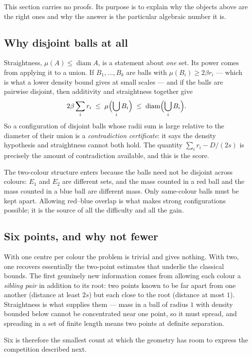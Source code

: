 \documentclass[11pt]{article}
\theoremstyle{plain}
\theoremstyle{definition}
\theoremstyle{remark}
\newcommand{\diam}{\operatorname{diam}}
\begin{document}
This section carries no proofs.  Its purpose is to explain why the objects
above are the right ones and why the answer is the particular algebraic
number it is.

\subsection{Why disjoint balls at all}

Straightness, $\mu(A)\le\diam A$, is a statement about \emph{one} set.  Its
power comes from applying it to a union.  If $B_1,\dots,B_k$ are balls with
$\mu(B_i)\ge 2\beta r_i$ --- which is what a lower density bound gives at
small scales --- and if the balls are pairwise disjoint, then additivity
and straightness together give
\[
 2\beta\sum_i r_i\;\le\;\mu\Bigl(\bigcup_i B_i\Bigr)\;\le\;\diam\Bigl(\bigcup_i
 B_i\Bigr).
\]
So a configuration of disjoint balls whose radii sum is large relative to
the diameter of their union is a \emph{contradiction certificate}: it says
the density hypothesis and straightness cannot both hold.  The quantity
$\sum_i r_i-D/(2s)$ is precisely the amount of contradiction available, and
this is the score.

The two-colour structure enters because the balls need not be disjoint
across colours: $E_1$ and $E_2$ are different sets, and the mass counted in
a red ball and the mass counted in a blue ball are different mass.  Only
same-colour balls must be kept apart.  Allowing red--blue overlap is what
makes strong configurations possible; it is the source of all the
difficulty and all the gain.

\subsection{Six points, and why not fewer}

With one centre per colour the problem is trivial and gives nothing.  With
two, one recovers essentially the two-point estimates that underlie the
classical bounds.  The first genuinely new information comes from allowing
each colour a \emph{sibling pair} in addition to its root: two points known
to be far apart from one another (distance at least $2s$) but each close to
the root (distance at most $1$).  Straightness is what supplies them ---
mass in a ball of radius $1$ with density bounded below cannot be
concentrated near one point, so it must spread, and spreading in a set of
finite length means two points at definite separation.

Six is therefore the smallest count at which the geometry has room to
express the competition described next.
\end{document}
